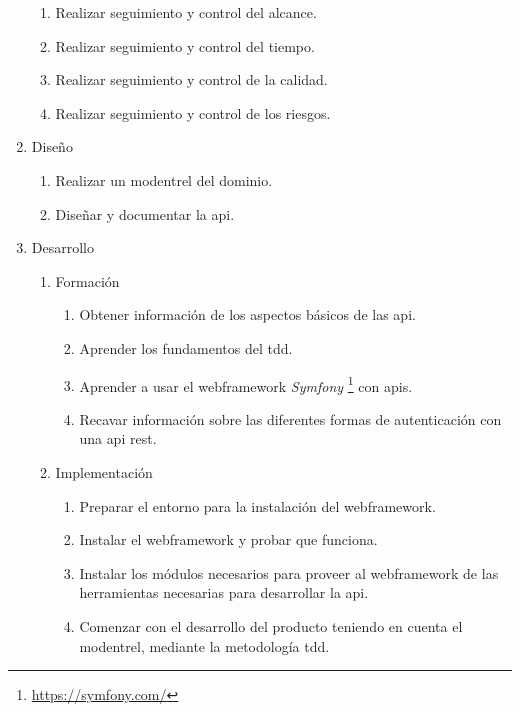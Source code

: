 \begin{enumerate}
\begin{enumerate}
    \item Realizar seguimiento y control del alcance.
    \item Realizar seguimiento y control del tiempo.
    \item Realizar seguimiento y control de la calidad.
    \item Realizar seguimiento y control de los riesgos.

  \end{enumerate}

  \item Diseño
  \label{item:diseno}

  \begin{enumerate}

    \item Realizar un \gls{modentrel} del dominio.
    \item Diseñar y documentar la \gls{api}. \label{item:disdocapi}

  \end{enumerate}

  \item Desarrollo

  \begin{enumerate}

    \item Formación

    \begin{enumerate}

      \item Obtener información de los aspectos básicos de las \gls{api}.
      \item Aprender los fundamentos del \gls{tdd}.
      \item Aprender a usar el \gls{webframework} \textit{Symfony}
        \footnote{\url{https://symfony.com/}} con \gls{api}s.
      \item Recavar información sobre las diferentes formas de autenticación
        con una \gls{api} \gls{rest}.

    \end{enumerate}
 
    \item Implementación

    \begin{enumerate}

      \item Preparar el entorno para la instalación del \gls{webframework}.
      \item Instalar el \gls{webframework} y probar que funciona.
      \item Instalar los módulos necesarios para proveer al \gls{webframework}
        de las herramientas necesarias para desarrollar la \gls{api}.
      \item Comenzar con el desarrollo del producto teniendo en cuenta el
        \gls{modentrel}, mediante la metodología \gls{tdd}.

    \end{enumerate}


  \end{enumerate}

\end{enumerate}

